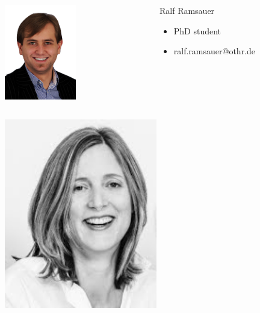 \documentclass{beamer}
\begin{document}
\begin{frame}
\begin{minipage}[c]{1.0\linewidth}
	\end{minipage}
	\begin{minipage}[c]{1.0\linewidth}
		\begin{columns}
		\begin{column}{0.35\textwidth}
			\begin{center}
     		\includegraphics[width=0.5\textwidth]{pics/speakers_ralf.png}
			\end{center}
		\end{column}
		\begin{column}{0.7\textwidth}
		\begin{block}{Ralf Ramsauer}
			\begin{itemize}
				\item PhD student
				\item ralf.ramsauer@othr.de
			\end{itemize}
		\end{block}
		\end{column}
		\end{columns}
	\end{minipage}
	\begin{minipage}[c]{1.0\linewidth}
		\begin{columns}
		\begin{column}{0.35\textwidth}
			\begin{center}
     		\includegraphics[width=0.5\textwidth]{pics/speakers_scherzinger.jpeg}

\end{center}
\end{column}
\end{columns}
\end{minipage}
\end{frame}
\end{document}

